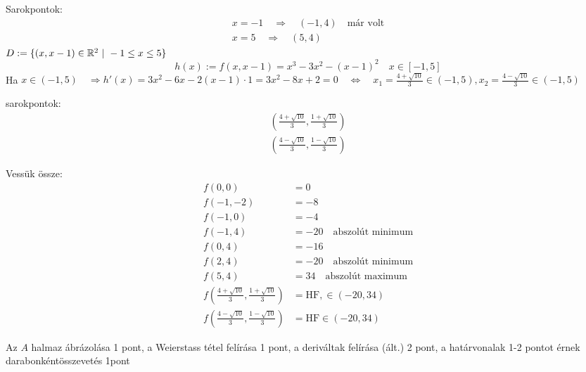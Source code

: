 \documentclass[a4paper,11.5pt]{article}
\begin{document}
\begin{task}
		Sarokpontok:
		\begin{align*}
			x=-1\quad \Rightarrow\quad (-1,4)\quad \text{már volt}\\
			x = 5\quad \Rightarrow\quad (5,4)
		\end{align*}
		$D:=\{ (x,x-1)\in\mathbb{R}^2\ | \ -1\leq x\leq 5 \}$
		\[ h(x):=f(x,x-1)=x^3-3x^2-(x-1)^2\quad x\in[-1,5] \]
		Ha $x\in(-1,5)\quad \Rightarrow h'(x)=3x^2-6x-2(x-1)\cdot1=3x^2-8x+2=0\quad \Leftrightarrow\quad x_1=\frac{4+\sqrt{10}}{3}\in(-1,5), x_2=\frac{4-\sqrt{10}}{3}\in(-1,5)$
		
		sarokpontok:
		\begin{align*}
			\left(\frac{4+\sqrt{10}}{3},\frac{1+\sqrt{10}}{3}\right)\\
			\left(\frac{4-\sqrt{10}}{3},\frac{1-\sqrt{10}}{3}\right)
		\end{align*}
		
		Vessük össze:
		\begin{align*}
			f(0,0)&=0\\
			f(-1,-2)&=-8\\
			f(-1,0)&=-4\\
			f(-1,4)&=-20\quad \text{abszolút minimum}\\
			f(0,4)&=-16\\
			f(2,4)&=-20\quad \text{abszolút minimum}\\
			f(5,4)&=34\quad \text{abszolút maximum}\\
			f\left(\frac{4+\sqrt{10}}{3},\frac{1+\sqrt{10}}{3}\right)&=\text{HF}, \in(-20,34)\\
			f\left(\frac{4-\sqrt{10}}{3},\frac{1-\sqrt{10}}{3}\right)&=\text{HF} \in(-20, 34)
		\end{align*}
	\end{task}
	\begin{note}
		Az $A$ halmaz ábrázolása 1 pont, a Weierstass tétel felírása 1 pont, a deriváltak felírása (ált.) 2 pont, a határvonalak 1-2 pontot érnek darabonkéntösszevetés 1pont
	\end{note}
\end{document}
